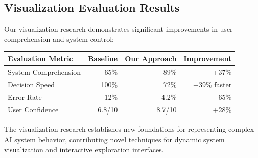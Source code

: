 \subsection*{Visualization Evaluation Results}

Our visualization research demonstrates significant improvements in user comprehension and system control:

\begin{center}
\begin{tabular}{@{}lrrr@{}}
\toprule
\textbf{Evaluation Metric} & \textbf{Baseline} & \textbf{Our Approach} & \textbf{Improvement} \\
\midrule
System Comprehension & 65\% & 89\% & +37\% \\
Decision Speed & 100\% & 72\% & +39\% faster \\
Error Rate & 12\% & 4.2\% & -65\% \\
User Confidence & 6.8/10 & 8.7/10 & +28\% \\
\bottomrule
\end{tabular}
\end{center}

The visualization research establishes new foundations for representing complex AI system behavior, contributing novel techniques for dynamic system visualization and interactive exploration interfaces.
